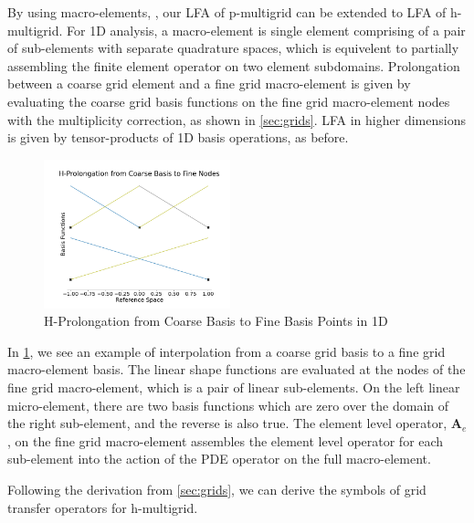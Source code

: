 \documentclass[review]{siamart190516}
\begin{document}
By using macro-elements, \cite{kumar2019local, brown2019local}, our LFA of p-multigrid can be extended to LFA of h-multigrid.
For 1D analysis, a macro-element is single element comprising of a pair of sub-elements with separate quadrature spaces, which is equivelent to partially assembling the finite element operator on two element subdomains.
Prolongation between a coarse grid element and a fine grid macro-element is given by evaluating the coarse grid basis functions on the fine grid macro-element nodes with the multiplicity correction, as shown in \cref{sec:grids}.
LFA in higher dimensions is given by tensor-products of 1D basis operations, as before.

\begin{figure}[!ht]
  \centering
  \includegraphics[width=0.48\textwidth]{img/hProlongation}
  \caption{H-Prolongation from Coarse Basis to Fine Basis Points in 1D}
  \label{fig:h_prolongation}
\end{figure}

In \cref{fig:h_prolongation}, we see an example of interpolation from a coarse grid basis to a fine grid macro-element basis.
The linear shape functions are evaluated at the nodes of the fine grid macro-element, which is a pair of linear sub-elements.
On the left linear micro-element, there are two basis functions which are zero over the domain of the right sub-element, and the reverse is also true.
The element level operator, $\mathbf{A}_e$, on the fine grid macro-element assembles the element level operator for each sub-element into the action of the PDE operator on the full macro-element.

Following the derivation from \cref{sec:grids}, we can derive the symbols of grid transfer operators for h-multigrid.
\end{document}
